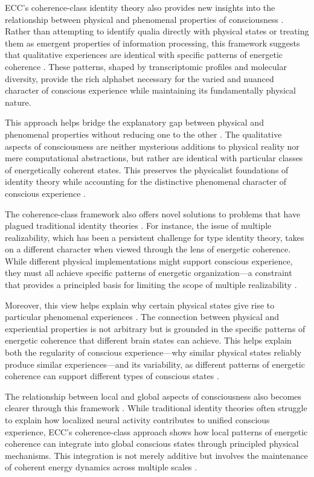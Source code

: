 \begin{refsection}
ECC's coherence-class identity theory also provides new insights into the relationship between physical and phenomenal properties of consciousness \cite{place1956is}. Rather than attempting to identify qualia directly with physical states or treating them as emergent properties of information processing, this framework suggests that qualitative experiences are identical with specific patterns of energetic coherence \cite{smart1959sensations}. These patterns, shaped by transcriptomic profiles and molecular diversity, provide the rich alphabet necessary for the varied and nuanced character of conscious experience while maintaining its fundamentally physical nature.

This approach helps bridge the explanatory gap between physical and phenomenal properties without reducing one to the other \cite{lewis1966argument}. The qualitative aspects of consciousness are neither mysterious additions to physical reality nor mere computational abstractions, but rather are identical with particular classes of energetically coherent states. This preserves the physicalist foundations of identity theory while accounting for the distinctive phenomenal character of conscious experience \cite{block1972what}.

The coherence-class framework also offers novel solutions to problems that have plagued traditional identity theories \cite{shapiro2000multiple}. For instance, the issue of multiple realizability, which has been a persistent challenge for type identity theory, takes on a different character when viewed through the lens of energetic coherence. While different physical implementations might support conscious experience, they must all achieve specific patterns of energetic organization—a constraint that provides a principled basis for limiting the scope of multiple realizability \cite{bechtel1999multiple}.

Moreover, this view helps explain why certain physical states give rise to particular phenomenal experiences \cite{kim1992multiple}. The connection between physical and experiential properties is not arbitrary but is grounded in the specific patterns of energetic coherence that different brain states can achieve. This helps explain both the regularity of conscious experience—why similar physical states reliably produce similar experiences—and its variability, as different patterns of energetic coherence can support different types of conscious states \cite{richardson2008multiple}.

The relationship between local and global aspects of consciousness also becomes clearer through this framework \cite{wilson2001two}. While traditional identity theories often struggle to explain how localized neural activity contributes to unified conscious experience, ECC's coherence-class approach shows how local patterns of energetic coherence can integrate into global conscious states through principled physical mechanisms. This integration is not merely additive but involves the maintenance of coherent energy dynamics across multiple scales \cite{polger2009evaluating}.


\end{refsection}
